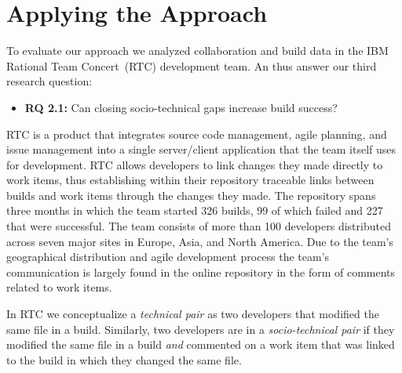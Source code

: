 \section{Applying the Approach}
To evaluate our approach we analyzed collaboration and build data in the IBM Rational Team Concert\texttrademark\ (RTC) development team. An thus answer our third research question:
\begin{itemize}
\item \textbf{RQ 2.1:} Can closing socio-technical gaps increase build success?
\end{itemize}
RTC is a product that integrates source code management, agile planning, and issue management into a single server/client application that the team itself uses for development.
RTC allows developers to link changes they made directly to work items, thus establishing within their repository traceable links between builds and work items through the changes they made.
The repository spans three months in which the team started 326 builds, 99 of which failed and 227 that were successful. 
The team consists of more than 100 developers distributed across seven major sites in Europe, Asia, and North America. Due to the team's geographical distribution and agile development process the team's  communication is largely found in the online repository in the form of comments related to work items. 


In RTC we conceptualize a \emph{technical pair} as two developers that modified the same file in a build.
Similarly, two developers are in a \emph{socio-technical pair} if they modified the same file in a build \emph{and} commented on a work item that was linked to the build in which they changed the same file.

